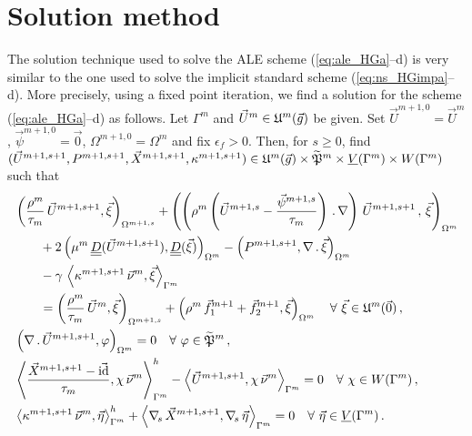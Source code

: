 \section{Solution method}\label{sec:ale_solution_method}
The solution technique used to solve the ALE scheme (\ref{eq:ale_HGa}--d) is
very similar to the one used to solve the implicit standard scheme
(\ref{eq:ns_HGimpa}--d). More precisely, using a fixed point iteration, we find
a solution for the scheme (\ref{eq:ale_HGa}--d) as follows. Let $\Gamma^m$
and $\vec U^m\in \uspacediscale{g}{m}$ be given.
Set $\vec U^{m+1,0}=\vec U^m$, $\vec \psi^{m+1,0} =
\vec 0$, $\Omega^{m+1,0}=\Omega^m$ and fix $\epsilon_f > 0$.
Then, for $s \geq 0$,
find $(\vec U^{m+1,s+1},P^{m+1,s+1}, \vec X^{m+1,s+1}, \kappa^{m+1,s+1}) \in
\uspacediscale{g}{m}\times \pnormspaceale^m \times \Vh \times \Wh$ such that
\begin{subequations}
\begin{align}
& \left( \frac{\rho^m}{\tau_m}\,\vec U^{m+1,s+1}, \vec
\xi\right)_{\Omega^{m+1,s}} + \left(\left(\rho^m\left(\vec
U^{m+1,s}-\frac{\vec\psi^{m+1,s}}{\tau_m}\right)\,.\,\nabla\right)\,
\vec U^{m+1,s+1}\,, \,\vec \xi \right)_{\Omega^m}\nonumber \\
& \qquad + 2\left(\mu^m\,\mat D(\vec U^{m+1,s+1}), \mat D(\vec \xi)
\right)_{\Omega^m} - \left(P^{m+1,s+1}, \nabla\,.\,\vec \xi\right)_{\Omega^m}
\nonumber \\
& \qquad - \gamma\,\left\langle \kappa^{m+1,s+1}\,\vec\nu^m,
\vec\xi\right\rangle_{\Gamma^m} \nonumber \\
& \qquad = \left(\frac{\rho^m}{\tau_m}\,\vec U^m,\vec \xi
\right)_{\Omega^{m+1,s}}
+ \left(\rho^m\,\vec f_1^{m+1}+\vec f_2^{m+1}, \vec \xi\right)_{\Omega^m}
\quad \forall\ \vec\xi \in \uspacediscale{0}{m}\,, \label{eq:ns_HGalea} \\
& \left(\nabla\,.\,\vec U^{m+1,s+1}, \varphi\right)_{\Omega^m}  = 0
\quad \forall\ \varphi \in \pnormspaceale^m\,,\label{eq:ns_HGaleb} \\
&  \left\langle \frac{\vec X^{m+1,s+1} - \vec\id}{\tau_m} ,\chi\,\vec\nu^m
\right\rangle_{\Gamma^m}^h - \left\langle \vec U^{m+1,s+1}, \chi\,\vec\nu^m
\right\rangle_{\Gamma^m}  = 0 \quad \forall\ \chi \in \Wh\,,
\label{eq:ns_HGalec}\\
& \left\langle \kappa^{m+1,s+1}\,\vec\nu^m, \vec\eta \right\rangle_{\Gamma^m}^h
+ \left\langle \nabs\,\vec X^{m+1,s+1}, \nabs\,\vec \eta
\right\rangle_{\Gamma^m} = 0 \quad \forall\ \vec\eta \in \Vh\,.
\label{eq:ns_HGaled}
\end{align}
\end{subequations}
